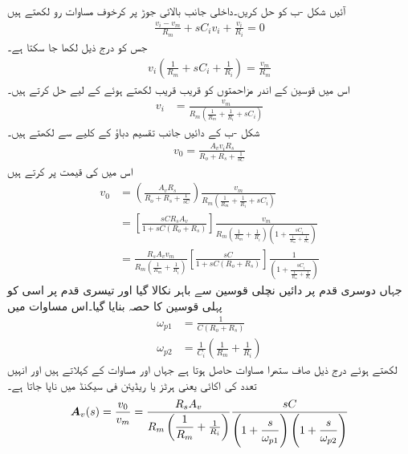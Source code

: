 آئیں شکل -ب کو حل کریں۔داخلی جانب بالائی جوڑ پر کرخوف مساوات رو لکھتے ہیں
\begin{align*}
\frac{v_i-v_m}{R_m}+sC_i v_i+\frac{v_i}{R_i}=0
\end{align*}
جس کو درج ذیل لکھا جا سکتا ہے۔
\begin{align*}
v_i\left(\frac{1}{R_m}+s C_i+\frac{1}{R_i}\right)=\frac{v_m}{R_m}
\end{align*}
اس میں قوسین کے اندر مزاحمتوں کو قریب قریب لکھتے ہوئے   کے لیے حل کرتے ہیں۔
\begin{align*}
v_i&=\frac{v_m}{R_m\left(\frac{1}{R_m}+\frac{1}{R_i}+s C_i\right)}
\end{align*}
شکل -ب کے دائیں جانب تقسیم دباؤ کے کلیے سے  لکھتے ہیں۔
\begin{align*}
v_0=\frac{A_v v_i R_s}{R_o+R_s+\frac{1}{s C}}
\end{align*}
اس میں  کی قیمت پر کرتے ہیں
\begin{align*}
v_0&=\left(\frac{A_v R_s}{R_o+R_s+\frac{1}{sC}}\right)\frac{v_m}{R_m\left(\frac{1}{R_m}+\frac{1}{R_i}+s C_i\right)}\\
&=\left[\frac{sC R_s A_v}{1+sC(R_o+R_s)}\right]\frac{v_m}{R_m\left(\frac{1}{R_m}+\frac{1}{R_i}\right)\left(1+\frac{s C_i}{\frac{1}{R_m}+\frac{1}{R_i}}\right)}\\
&=\frac{R_s A_v v_m}{R_m\left(\frac{1}{R_m}+\frac{1}{R_i}\right)}\left[\frac{sC}{1+sC(R_o+R_s)}\right]\frac{1}{\left(1+\frac{s C_i}{\frac{1}{R_m}+\frac{1}{R_i}}\right)}
\end{align*}
جہاں دوسری قدم پر دائیں نچلی قوسین سے  باہر نکالا گیا اور تیسری قدم پر اسی کو پہلی قوسین کا حصہ بنایا گیا۔اس مساوات میں
\begin{align*}
\omega_{p1}&=\frac{1}{C(R_o+R_s)}\\
\omega_{p2}&=\frac{1}{C_i}\left(\frac{1}{R_m}+\frac{1}{R_i}\right)
\end{align*}
لکھتے ہوئے درج ذیل صاف ستھرا مساوات حاصل ہوتا ہے جہاں  اور  مساوات کے    کہلاتے ہیں اور انہیں تعدد کی اکائی یعنی ہرٹز  یا ریڈیئن فی سیکنڈ  میں ناپا جاتا ہے۔
\begin{align}
{\ensuremath{{\boldsymbol{A}}}}_v(s)=\frac{v_0}{v_m}=\dfrac{R_s A_v }{R_m\left(\dfrac{1}{R_m}+\frac{1}{R_i}\right)}\dfrac{sC}{\left(1+\dfrac{s}{\omega_{p1}}\right)\left(1+\dfrac{s}{\omega_{p2}}\right)}
\end{align}
